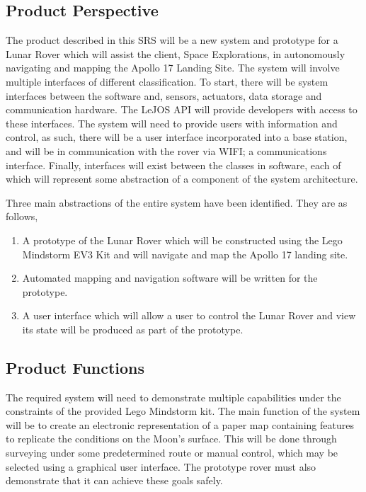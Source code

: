 \documentclass{article}
\begin{document}
\subsection{Product Perspective}
\begin{adjustwidth}{1em}{0pt}
The product described in this SRS will be a new system and prototype for a Lunar Rover which will assist the client, Space Explorations, in autonomously navigating and mapping the Apollo 17 Landing Site. The system will involve multiple interfaces of different classification. To start, there will be system interfaces between the software and, sensors, actuators, data storage and communication hardware. The LeJOS API will provide developers with access to these interfaces. The system will need to provide users with information and control, as such, there will be a user interface incorporated into a base station, and will be in communication with the rover via WIFI; a communications interface. Finally, interfaces will exist between the classes in software, each of which will represent some abstraction of a component of the system architecture. 

Three main abstractions of the entire system have been identified. They are as follows, 
\begin{enumerate}
\item A prototype of the Lunar Rover which will be constructed using the Lego Mindstorm EV3 Kit and will navigate and map the Apollo 17 landing site.
\item Automated mapping and navigation software will be written for the prototype.
\item A user interface which will allow a user to control the Lunar Rover and view its state will be produced as part of the prototype.

\end{enumerate}
\end{adjustwidth}

\subsection{Product Functions}
\begin{adjustwidth}{1em}{0pt}
The required system will need to demonstrate multiple capabilities under the constraints of the provided Lego Mindstorm kit. The main function of the system will be to create an electronic representation of a paper map containing features to replicate the conditions on the Moon's surface. This will be done through surveying under some predetermined route or manual control, which may be selected using a graphical user interface. The prototype rover must also demonstrate that it can achieve these goals safely.  

\end{adjustwidth}
\end{document}
